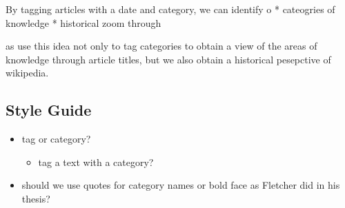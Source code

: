 \documentclass[a4paper, 12pt]{article}
\begin{document}
By tagging articles with a date and category, we can identify o
* cateogries of knowledge
* historical zoom through

as use this idea not only to tag categories to obtain a view of the areas of knowledge through article titles, 
but we also obtain a historical pesepctive of wikipedia.


\subsection*{Style Guide}

\begin{itemize}
    \item  tag or category? 
        \begin{itemize}
            \item  tag a text with a category?
        \end{itemize}
    \item  should we use quotes for category names or bold face as Fletcher did in his thesis?
\end{itemize}
\end{document}
